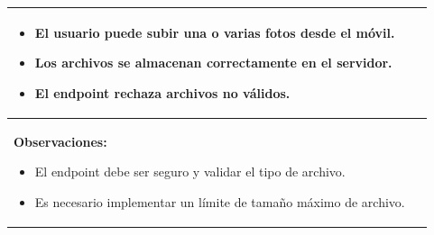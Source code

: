 \begin{table}[H]
\begin{center}
\begin{tabularx}{\textwidth}{|l|X|l|}
{\begin{itemize}
                    \item El usuario puede subir una o varias fotos desde el móvil.
                    \item Los archivos se almacenan correctamente en el servidor.
                    \item El endpoint rechaza archivos no válidos.
                \end{itemize}
            }\\
            \hline
            \multicolumn{3}{|p{\textwidth}|}{
                \textbf{Observaciones:}
                \begin{itemize}
                    \item El endpoint debe ser seguro y validar el tipo de archivo.
                    \item Es necesario implementar un límite de tamaño máximo de archivo.
                \end{itemize}
            }\\
            \hline
        \end{tabularx}
    \end{center}
\end{table}

